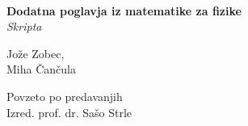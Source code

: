 \documentclass[a4paper]{book}
\begin{document}
\begin{titlepage}
	\begin{center}
	\ \\[5cm]
	\LARGE{\bf Dodatna poglavja iz matematike za fizike}\\[0.5cm]
	\large{\it Skripta}\\[3cm]
	\begin{minipage}{0.4\textwidth}\small
		\begin{flushleft}
			\large{Jo\v ze Zobec,}\\[0.5cm]
			\large{Miha \v Can\v cula}
		\end{flushleft}
	\end{minipage}
	\begin{minipage}{0.4\textwidth}\small
		\begin{flushright}
			\large{\sc Povzeto po predavanjih}\\[0.5cm]
			\large{Izred. prof. dr. Sa\v so Strle}
		\end{flushright}
	\end{minipage}
	\end{center}
\end{titlepage}




\end{document}
